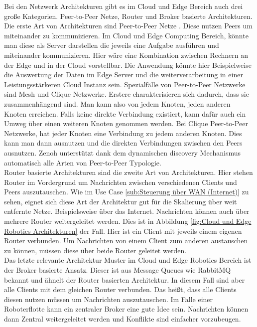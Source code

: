 Bei den Netzwerk Architekturen gibt es im Cloud und Edge Bereich auch drei große Kategorien. Peer-to-Peer Netze, Router und Broker basierte Architekturen.\\
Die erste Art von Architekturen sind Peer-to-Peer Netze \cite{schollmeierDefinitionPeertoPeerNetworking2001}. Diese nutzen Peers um miteinander zu kommunizieren. Im Cloud und Edge Computing Bereich, könnte man diese als Server darstellen die jeweils eine Aufgabe ausführen und miteinander kommunizieren. Hier wäre eine Kombination zwischen Rechnern an der Edge und in der Cloud vorstellbar. Die Anwendung könnte hier Beispielweise die Auswertung der Daten im Edge Server und die weiterverarbeitung in einer Leistungsstärkeren Cloud Instanz sein. Spezialfälle von Peer-to-Peer Netzwerke sind Mesh \cite{cilfoneWirelessMeshNetworking2019} und Clique \cite{enwiki:1096684789} Netzwerke. Erstere charakterisieren sich dadurch, dass sie zusammenhängend sind. Man kann also von jedem Knoten, jeden anderen Knoten erreichen. Falls keine direkte Verbindung existiert, kann dafür auch ein Umweg über einen weiteren Knoten genommen werden. Bei Clique Peer-to-Peer Netzwerke, hat jeder Knoten eine Verbindung zu jedem anderen Knoten. Dies kann man dann ausnutzen und die direkten Verbindungen zwischen den Peers ausnutzen. Zenoh unterstützt dank dem dynamischen discovery Mechanismus automatisch alle Arten von Peer-to-Peer Typologie.\\
Router basierte Architekturen sind die zweite Art von Architekturen. Hier stehen Router im Vordergrund um Nachrichten zwischen verschiedenen Clients und Peers auszutauschen. Wie im Use Case \ref{sub:Steuerung über WAN (Internet)} zu sehen, eignet sich diese Art der Architektur gut für die Skalierung über weit entfernte Netze. Beispielsweise über das Internet. Nachrichten können auch über mehrere Router weitergeleitet werden. Dies ist in Abbildung \ref{fig:Cloud und Edge Robotics Architekturen} der Fall. Hier ist ein Client mit jeweils einem eigenen Router verbunden. Um Nachrichten von einem Client zum anderen austauschen zu können, müssen diese über beide Router geleitet werden.\\
Das letzte relevante Architektur Muster im Cloud und Edge Robotics Bereich ist der Broker basierte Ansatz. Dieser ist aus Message Queues wie RabbitMQ \cite{AMQP091Model} bekannt und ähnelt der Router basierten Architektur. In diesem Fall sind aber alle Clients mit dem gleichen Router verbunden. Das heißt, dass alle Clients diesen nutzen müssen um Nachrichten auszutauschen. Im Falle einer Roboterflotte kann ein zentraler Broker eine gute Idee sein. Nachrichten können dann Zentral weitergeleitet werden und Konflikte sind einfacher vorzubeugen.\\

